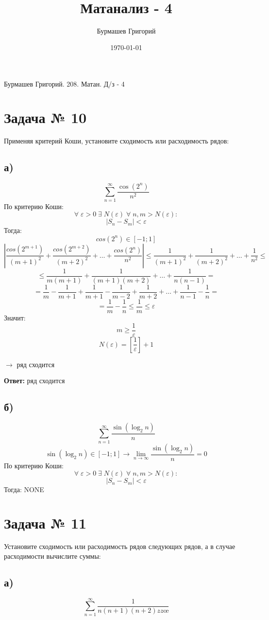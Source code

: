 \documentclass[a4paper,12pt]{article}
\author{Бурмашев Григорий}
\title{Матанализ  - 4}
\date{\today}
\begin{document}
\begin{large}
\begin{center}
Бурмашев Григорий.  208. Матан. Д/з - 4
\end{center}
\end{large}
\newpage
\section*{Задача № 10}
Применяя критерий Коши, установите сходимость или расходимость рядов:
\subsection*{ а)}
\[
\sum\limits_{n=1}^{\infty} \frac{\cos(2^n)}{n^2}
\]
По критерию Коши:
\[
\forall \; \varepsilon > 0 \; \exists \; N(\varepsilon) \; \forall \; n, m > N(\varepsilon):
\]
\[
|S_n - S_m| < \varepsilon
\]
Тогда:
\[
cos(2^n) \in [-1; 1]
\]
\[
|\frac{cos(2^{m+1})}{(m+1)^2} + \frac{cos(2^{m+2})}{(m+2)^2} + \ldots + \frac{cos(2^n)}{n^2}| \leq \frac{1}{(m+1)^2} + \frac{1}{(m+2)^2} + \ldots + \frac{1}{n^2} \leq 
\]
\[
\leq \frac{1}{m(m+1)} + \frac{1}{(m+1)(m+2)} + \ldots + \frac{1}{n(n-1)} =  
\]
\[
=
\frac{1}{m} - \frac{1}{m+1} + \frac{1}{m+1} - \frac{1}{m-2} + \frac{1}{m+2} + \ldots +\frac{1}{n-1} - \frac{1}{n} = 
\]
\[
=
\frac{1}{m} - \frac{1}{n} \leq \frac{1}{m}
\leq \varepsilon
\]
Значит:
\[
m \geq \frac{1}{\varepsilon}
\]
\[
N(\varepsilon) = \left[\frac{1}{\varepsilon}\right] + 1 
\] 
\begin{center}
$\rightarrow$ ряд сходится
\end{center}
\begin{center}
\textbf{Ответ:}  ряд сходится
\end{center}
\subsection*{ б)}
\[
\sum\limits_{n=1}^{\infty} \frac{\sin(\log_2 n)}{n}
\]
\[
\sin(\log_2 n) \in [-1;1] \rightarrow \lim_{n \rightarrow \infty} \frac{\sin(\log_2 n)}{n}  = 0
\]
По критерию Коши:
\[
\forall \; \varepsilon > 0 \; \exists \; N(\varepsilon) \; \forall \; n, m > N(\varepsilon):
\]
\[
|S_n - S_m| < \varepsilon
\]
Тогда:
NONE
\section*{Задача № 11}
Установите сходимость или расходимость рядов следующих рядов, а в случае расходимости вычислите суммы:
\subsection*{ а)}
\[
\sum\limits_{n=1}^{\infty} \frac{1}{n(n+1)(n+2)zzœ}
\]
\end{document}
